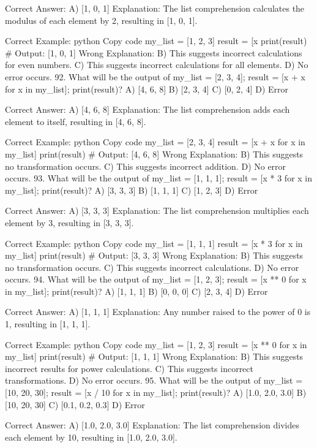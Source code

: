 Correct Answer: A) [1, 0, 1]
Explanation: The list comprehension calculates the modulus of each element by 2, resulting in [1, 0, 1].

Correct Example:
python
Copy code
my_list = [1, 2, 3]
result = [x %
print(result)  # Output: [1, 0, 1]
Wrong Explanation:
B) This suggests incorrect calculations for even numbers.
C) This suggests incorrect calculations for all elements.
D) No error occurs.
92. What will be the output of my_list = [2, 3, 4]; result = [x + x for x in my_list]; print(result)?
A) [4, 6, 8]
B) [2, 3, 4]
C) [0, 2, 4]
D) Error

Correct Answer: A) [4, 6, 8]
Explanation: The list comprehension adds each element to itself, resulting in [4, 6, 8].

Correct Example:
python
Copy code
my_list = [2, 3, 4]
result = [x + x for x in my_list]
print(result)  # Output: [4, 6, 8]
Wrong Explanation:
B) This suggests no transformation occurs.
C) This suggests incorrect addition.
D) No error occurs.
93. What will be the output of my_list = [1, 1, 1]; result = [x * 3 for x in my_list]; print(result)?
A) [3, 3, 3]
B) [1, 1, 1]
C) [1, 2, 3]
D) Error

Correct Answer: A) [3, 3, 3]
Explanation: The list comprehension multiplies each element by 3, resulting in [3, 3, 3].

Correct Example:
python
Copy code
my_list = [1, 1, 1]
result = [x * 3 for x in my_list]
print(result)  # Output: [3, 3, 3]
Wrong Explanation:
B) This suggests no transformation occurs.
C) This suggests incorrect calculations.
D) No error occurs.
94. What will be the output of my_list = [1, 2, 3]; result = [x ** 0 for x in my_list]; print(result)?
A) [1, 1, 1]
B) [0, 0, 0]
C) [2, 3, 4]
D) Error

Correct Answer: A) [1, 1, 1]
Explanation: Any number raised to the power of 0 is 1, resulting in [1, 1, 1].

Correct Example:
python
Copy code
my_list = [1, 2, 3]
result = [x ** 0 for x in my_list]
print(result)  # Output: [1, 1, 1]
Wrong Explanation:
B) This suggests incorrect results for power calculations.
C) This suggests incorrect transformations.
D) No error occurs.
95. What will be the output of my_list = [10, 20, 30]; result = [x / 10 for x in my_list]; print(result)?
A) [1.0, 2.0, 3.0]
B) [10, 20, 30]
C) [0.1, 0.2, 0.3]
D) Error

Correct Answer: A) [1.0, 2.0, 3.0]
Explanation: The list comprehension divides each element by 10, resulting in [1.0, 2.0, 3.0].

